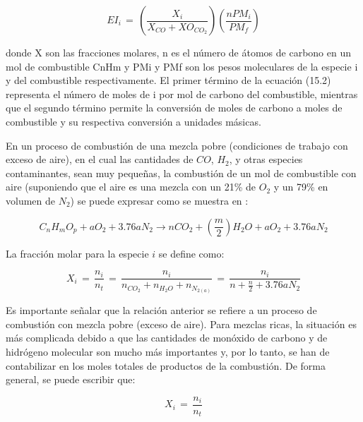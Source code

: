 \begin{equation}
\label{ec:indicecombustiontotal}
EI_i\,=\,\left( \dfrac{X_i}{X_{CO}+XO_{CO_2}} \right) \left( \dfrac{nPM_i}{PM_f} \right)
\end{equation}

donde X son las fracciones molares, n es el número de átomos de carbono en un mol de combustible CnHm y PMi y PMf son los pesos moleculares de la especie i y del combustible respectivamente. El primer término de la ecuación (15.2) representa el número de moles de i por mol de carbono del combustible, mientras que el segundo término permite la conversión de moles de carbono a moles de combustible y su respectiva conversión a unidades másicas. 

\par En un proceso de combustión de una mezcla pobre (condiciones de trabajo con exceso de aire), en el cual las cantidades de $CO$, $H_2$, y otras especies contaminantes, sean muy pequeñas, la combustión de un mol de combustible con aire (suponiendo que el aire es una mezcla con un 21\% de $O_2$ y un 79\% en volumen de $N_2$) se puede expresar como se muestra en :

\begin{equation}
\label{ec:combustionpobre}
C_nH_mO_p + aO_2 +3.76aN_2 \rightarrow nCO_2+ \left( \dfrac{m}{2} \right)H_2O+aO_2+3.76aN_2
\end{equation}

\par La fracción molar para la especie $i$ se define como: 

\begin{equation}
\label{ec:fraccionmolar}
X_i\,=\, \dfrac{n_i}{n_t}\,=\, \dfrac{n_i}{n_{CO_2}+n_{H_2O}+n_{N_{2(a)}}}\,=\, \dfrac{n_i}{n+\frac{n}{2}+3.76aN_2}
\end{equation}

\par Es importante señalar que la relación anterior se refiere a un proceso de combustión con mezcla pobre (exceso de aire). Para mezclas ricas, la situación es más complicada debido a que las cantidades de monóxido de carbono y de hidrógeno molecular son mucho más importantes y, por lo tanto, se han de contabilizar en los moles totales de productos de la combustión. De forma general, se puede escribir que:

\begin{equation}
\label{ec:fraccionmolargeneral}
X_i\,=\, \dfrac{n_i}{n_t}
\end{equation}


